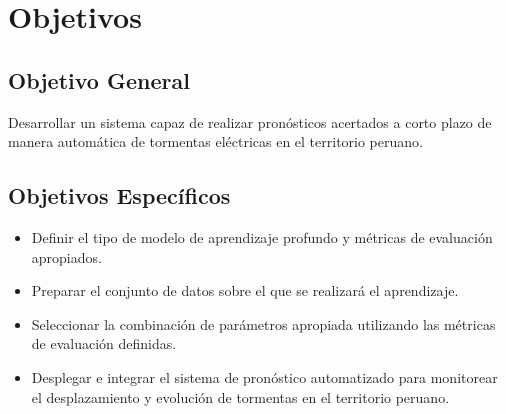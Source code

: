 \section{Objetivos}
\subsection{Objetivo General}

Desarrollar un sistema capaz de realizar pronósticos acertados a corto plazo de 
manera automática de tormentas eléctricas en el territorio peruano.

\subsection{Objetivos Específicos}
\begin{itemize}

\item Definir el tipo de modelo de aprendizaje profundo y métricas de evaluación 
apropiados.

\item Preparar el conjunto de datos sobre el que se realizará el aprendizaje.

\item Seleccionar la combinación de parámetros apropiada utilizando las métricas 
de evaluación definidas.

\item Desplegar e integrar el sistema de pronóstico automatizado para monitorear 
el desplazamiento y evolución de tormentas en el territorio peruano.

\end{itemize}





